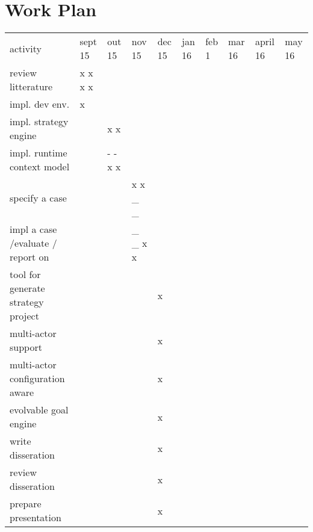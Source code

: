 \section{Work Plan}

\begin{landscape}

\begin{tabular}{ |l| l| l| l| l| l| l| l| l| l| }
  \hline
  activity                    & sept 15 & out 15  & nov 15 & dec 15 & jan 16 & feb 1 & mar 16 & april 16 & may 16 \\
  review litterature          & x x x x &  &  &  &  & & & & \\
  impl. dev env.              & x       &         & & & & & & & \\
  impl. strategy engine       &         & x x     & & & & & & & \\
  impl. runtime context model &         & - - x x & & & & & & & \\
  specify a case              &         &         & x x _ _ & & & & & & \\
  impl a case /evaluate / report on &   &         & _ _ x x & & & & & & \\
  tool for generate strategy project & & & & x & & & & & \\
  multi-actor support                & & & & x & & & & & \\
  multi-actor configuration aware    & & & & x & & & & & \\
  evolvable goal engine              & & & & x & & & & & \\
  write disseration              & & & & x & & & & & \\
  review disseration              & & & & x & & & & & \\
  prepare presentation              & & & & x & & & & & \\

  \hline
\end{tabular}

\end{landscape}
